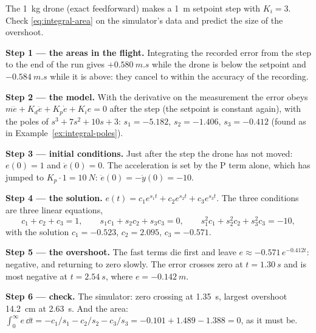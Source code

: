 \begin{example}
\label{ex:integral-overshoot}
The \SI{1}{kg} drone (exact feedforward) makes a \SI{1}{m} setpoint step with $K_i = 3$. Check \cref{eq:integral-area} on the simulator's data and predict the size of the overshoot.

\textbf{Step 1 — the areas in the flight.} Integrating the recorded error from the step to the end of the run gives $+\SI{0.580}{m.s}$ while the drone is below the setpoint and $-\SI{0.584}{m.s}$ while it is above: they cancel to within the accuracy of the recording.

\textbf{Step 2 — the model.} With the derivative on the measurement the error obeys $m\dddot e + K_d\ddot e + K_p\dot e + K_i e = 0$ after the step (the setpoint is constant again), with the poles of $s^3 + 7s^2 + 10s + 3$: $s_1 = -5.182$, $s_2 = -1.406$, $s_3 = -0.412$ (found as in Example~\ref{ex:integral-poles}).

\textbf{Step 3 — initial conditions.} Just after the step the drone has not moved: $e(0) = 1$ and $\dot e(0) = 0$. The acceleration is set by the P term alone, which has jumped to $K_p \cdot 1 = \SI{10}{N}$: $\ddot e(0) = -\ddot y(0) = -10$.

\textbf{Step 4 — the solution.} $e(t) = c_1e^{s_1t} + c_2e^{s_2t} + c_3e^{s_3t}$. The three conditions are three linear equations,
\begin{equation*}
  c_1 + c_2 + c_3 = 1, \qquad s_1c_1 + s_2c_2 + s_3c_3 = 0, \qquad s_1^2c_1 + s_2^2c_2 + s_3^2c_3 = -10 ,
\end{equation*}
with the solution $c_1 = -0.523$, $c_2 = 2.095$, $c_3 = -0.571$.

\textbf{Step 5 — the overshoot.} The fast terms die first and leave $e \approx -0.571\,e^{-0.412t}$: negative, and returning to zero slowly. The error crosses zero at $t = \SI{1.30}{s}$ and is most negative at $t = \SI{2.54}{s}$, where $e = \SI{-0.142}{m}$.

\textbf{Step 6 — check.} The simulator: zero crossing at \SI{1.35}{s}, largest overshoot \SI{14.2}{cm} at \SI{2.63}{s}. And the area: $\int_0^\infty e\,\dd t = -c_1/s_1 - c_2/s_2 - c_3/s_3 = -0.101 + 1.489 - 1.388 = 0$, as it must be.
\end{example}

